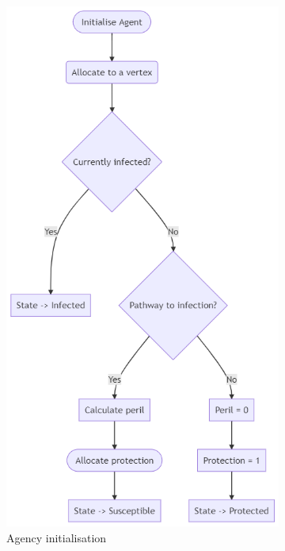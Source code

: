 \documentclass[../report.tex]{subfiles}
\begin{document}
\begin{figure}[!ht] 
\begin{centering}
  \begin{subfigure}{0.4\linewidth}
    \centering
    \includegraphics[width=0.9\linewidth]{assets/agent-initialisation}
    \caption{Agency initialisation}
    \label{fig:agent}
  \end{subfigure}%
  \begin{subfigure}{0.6\linewidth}
    \centering

\end{subfigure}
\end{centering}
\end{figure}
\end{document}
